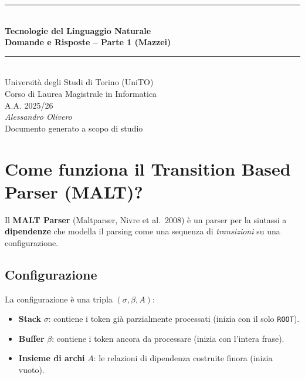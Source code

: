 \documentclass[12pt,a4paper]{article}
\begin{document}
\begin{titlepage}
  \centering
  \vspace*{2cm}
  {\color{primary}\rule{\linewidth}{2pt}}\\[0.5cm]
  {\Huge\bfseries\color{primary} Tecnologie del Linguaggio Naturale}\\[0.4cm]
  {\Large\bfseries\color{darkgray} Domande e Risposte -- Parte 1 (Mazzei)}\\[0.3cm]
  {\color{primary}\rule{\linewidth}{2pt}}\\[1cm]
  {\large Università degli Studi di Torino (UniTO)}\\[0.2cm]
  {\large Corso di Laurea Magistrale in Informatica}\\[0.2cm]
  {\large A.A. 2025/26}\\[2cm]
  {\large\itshape Alessandro Olivero}\\[4cm]
  {\small\color{darkgray} Documento generato a scopo di studio}
  \vfill
\end{titlepage}

\tableofcontents
\newpage

\section{Come funziona il Transition Based Parser (MALT)?}

Il \textbf{MALT Parser} (Maltparser, Nivre et al.\ 2008) è un parser per la sintassi a \textbf{dipendenze} che modella il parsing come una sequenza di \emph{transizioni} su una configurazione.

\subsection{Configurazione}

La configurazione è una tripla $(\sigma, \beta, A)$:
\begin{defbox}
\begin{itemize}[leftmargin=1.5em]
  \item \textbf{Stack} $\sigma$: contiene i token già parzialmente processati (inizia con il solo \texttt{ROOT}).
  \item \textbf{Buffer} $\beta$: contiene i token ancora da processare (inizia con l'intera frase).
  \item \textbf{Insieme di archi} $A$: le relazioni di dipendenza costruite finora (inizia vuoto).
\end{itemize}
\end{defbox}
\end{document}
